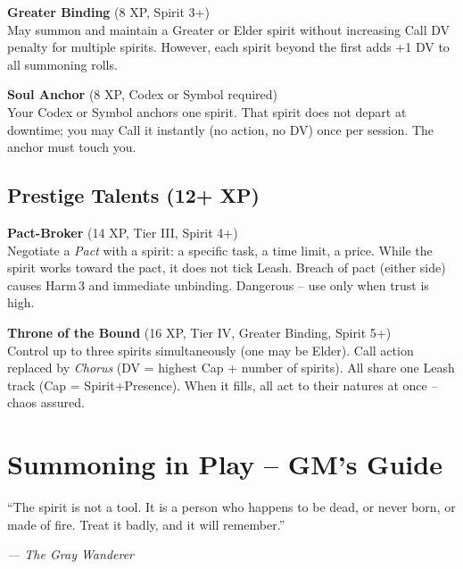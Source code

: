 \documentclass[10pt,a5paper]{book}
\begin{document}
\begin{tcolorbox}[colback=blue!5, colframe=blue!70]
\textbf{Greater Binding} (8 XP, Spirit 3+) \\
May summon and maintain a Greater or Elder spirit without increasing Call DV penalty for multiple spirits. However, each spirit beyond the first adds +1 DV to all summoning rolls.
\end{tcolorbox}

\begin{tcolorbox}[colback=blue!5, colframe=blue!70]
\textbf{Soul Anchor} (8 XP, Codex or Symbol required) \\
Your Codex or Symbol anchors one spirit. That spirit does not depart at downtime; you may Call it instantly (no action, no DV) once per session. The anchor must touch you.
\end{tcolorbox}

\section{Prestige Talents (12+ XP)}

\begin{tcolorbox}[colback=red!5, colframe=red!70]
\textbf{Pact-Broker} (14 XP, Tier III, Spirit 4+) \\
Negotiate a \textit{Pact} with a spirit: a specific task, a time limit, a price. While the spirit works toward the pact, it does not tick Leash. Breach of pact (either side) causes Harm 3 and immediate unbinding. Dangerous – use only when trust is high.
\end{tcolorbox}

\begin{tcolorbox}[colback=red!5, colframe=red!70]
\textbf{Throne of the Bound} (16 XP, Tier IV, Greater Binding, Spirit 5+) \\
Control up to three spirits simultaneously (one may be Elder). Call action replaced by \textit{Chorus} (DV = highest Cap + number of spirits). All share one Leash track (Cap = Spirit+Presence). When it fills, all act to their natures at once – chaos assured.
\end{tcolorbox}

\clearpage

\chapter{Summoning in Play – GM’s Guide}
\epigraph{“The spirit is not a tool. It is a person who happens to be dead, or never born, or made of fire. Treat it badly, and it will remember.”}{\textit{— The Gray Wanderer}}
\end{document}
